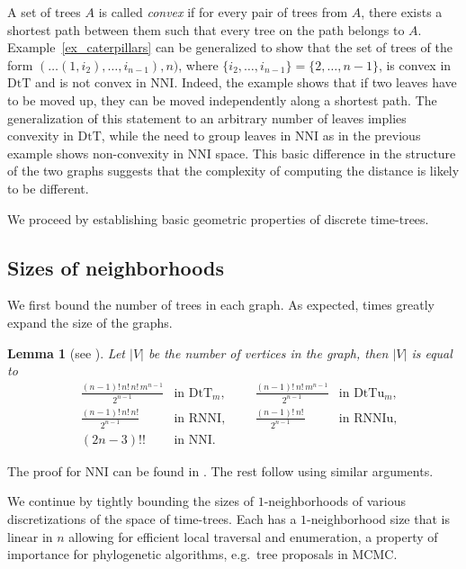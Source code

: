 \documentclass[11pt]{amsart}
\newtheorem{lemma}{Lemma}
\theoremstyle{definition}
\newcommand{\nni}{\mathrm{NNI}}
\newcommand{\rnni}{\mathrm{RNNI}}
\newcommand{\rnniu}{\mathrm{RNNIu}}
\newcommand{\dtt}{\mathrm{DtT}}
\newcommand{\dttu}{\mathrm{DtTu}}
\begin{document}
A set of trees $A$ is called \emph{convex} if for every pair of trees from $A$, there exists a shortest path between them such that every tree on the path belongs to $A$.
Example~\ref{ex_caterpillars} can be generalized to show that the set of trees of the form $(\ldots(1, i_2), \ldots, i_{n-1}), n)$, where $\{i_2, \ldots, i_{n-1}\} = \{2, \ldots, n-1\}$, is convex in $\dtt$ and is not convex in $\nni$.
Indeed, the example shows that if two leaves have to be moved up, they can be moved independently along a shortest path.
The generalization of this statement to an arbitrary number of leaves implies convexity in $\dtt$, while the need to group leaves in $\nni$ as in the previous example shows non-convexity in $\nni$ space.
This basic difference in the structure of the two graphs suggests that the complexity of computing the distance is likely to be different.

We proceed by establishing basic geometric properties of discrete time-trees.


\subsection{Sizes of neighborhoods}

We first bound the number of trees in each graph.
As expected, times greatly expand the size of the graphs.

\begin{lemma}[see \autocite{Semple2003-nj}]
\label{spaceSizes}
Let $|V|$ be the number of vertices in the graph, then $|V|$ is equal to
\begin{align*}
& \frac{(n-1)!\,n!\,n!\,m^{n-1}}{2^{n-1}}	& \mbox{in $\dtt_m$,}
&&& \frac{(n-1)!\,n!\,m^{n-1}}{2^{n-1}}		& \mbox{in $\dttu_m$,}\\
& \frac{(n-1)!\,n!\,n!}{2^{n-1}}		& \mbox{in $\rnni$,}
&&& \frac{(n-1)!\,n!\,}{2^{n-1}}		& \mbox{in $\rnniu$,}\\
& (2n - 3)!!					& \mbox{in $\nni$.}
\end{align*}
\end{lemma}

\proof
The proof for $\nni$ can be found in \autocite{Semple2003-nj}.
The rest follow using similar arguments.
\endproof

We continue by tightly bounding the sizes of $1$-neighborhoods of various discretizations of the space of time-trees.
Each has a $1$-neighborhood size that is linear in $n$ allowing for efficient local traversal and enumeration, a property of importance for phylogenetic algorithms, e.g.\ tree proposals in MCMC.
\end{document}
